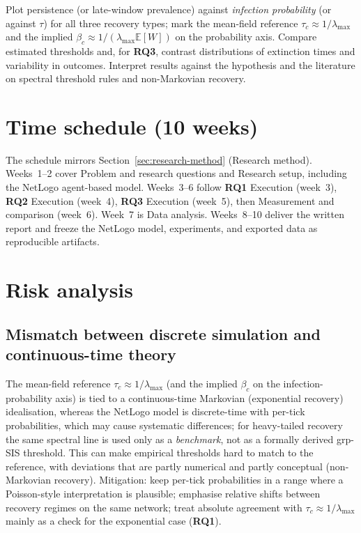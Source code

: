 \documentclass[11pt,a4paper]{article}
\begin{document}
Plot persistence (or late-window prevalence) against \emph{infection probability} (or against $\tau$) for all three recovery types; mark the mean-field reference $\tau_c \approx 1/\lambda_{\max}$ and the implied $\beta_c \approx 1/(\lambda_{\max}\mathbb{E}[W])$ on the probability axis. Compare estimated thresholds and, for \textbf{RQ3}, contrast distributions of extinction times and variability in outcomes. Interpret results against the hypothesis and the literature on spectral threshold rules and non-Markovian recovery.

\section{Time schedule (10 weeks)}

The schedule mirrors Section~\ref{sec:research-method} (Research method). Weeks~1--2 cover Problem and research questions and Research setup, including the NetLogo agent-based model. Weeks~3--6 follow \textbf{RQ1} Execution (week~3), \textbf{RQ2} Execution (week~4), \textbf{RQ3} Execution (week~5), then Measurement and comparison (week~6). Week~7 is Data analysis. Weeks~8--10 deliver the written report and freeze the NetLogo model, experiments, and exported data as reproducible artifacts.

\section{Risk analysis}

\subsection*{Mismatch between discrete simulation and continuous-time theory}

The mean-field reference $\tau_c \approx 1/\lambda_{\max}$ (and the implied $\beta_c$ on the infection-probability axis) is tied to a continuous-time Markovian (exponential recovery) idealisation, whereas the NetLogo model is discrete-time with per-tick probabilities, which may cause systematic differences; for heavy-tailed recovery the same spectral line is used only as a \emph{benchmark}, not as a formally derived grp-SIS threshold. This can make empirical thresholds hard to match to the reference, with deviations that are partly numerical and partly conceptual (non-Markovian recovery). Mitigation: keep per-tick probabilities in a range where a Poisson-style interpretation is plausible; emphasise relative shifts between recovery regimes on the same network; treat absolute agreement with $\tau_c \approx 1/\lambda_{\max}$ mainly as a check for the exponential case (\textbf{RQ1}).
\end{document}
